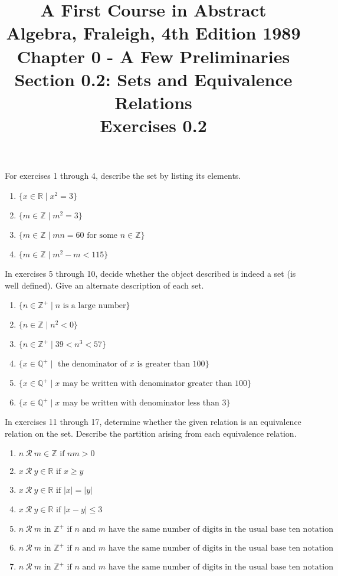 \documentclass[10pt,letterpaper]{article}
\title{A First Course in Abstract Algebra, Fraleigh, 4th Edition 1989\\ Chapter 0 - A Few Preliminaries\\Section 0.2: Sets and Equivalence Relations\\ Exercises 0.2}
\begin{document}
\maketitle
  For exercises 1 through 4, describe the set by listing its elements. 
  \begin{enumerate}
    \item $\{x \in \mathbb{R} \mid x^2 = 3\}$
    \item $\{m \in \mathbb{Z} \mid m^2 = 3\}$
    \item $\{m \in \mathbb{Z} \mid mn = 60 \text{ for some } n \in \mathbb{Z}\}$
    \item $\{m \in \mathbb{Z} \mid m^2 - m < 115\}$
  \end{enumerate}

  In exercises 5 through 10, decide whether the object described is indeed a set (is well defined). 
  Give an alternate description of each set.
  \begin{enumerate}[resume]
    \item $\{n \in \mathbb{Z}^+ \mid n \text{ is a large number}\}$
    \item $\{n \in \mathbb{Z} \mid n^2 < 0\}$
    \item $\{n \in \mathbb{Z}^+ \mid 39 < n^3 < 57\}$
    \item $\{x \in \mathbb{Q}^+ \mid \text{ the denominator of $x$ is greater than 100}\}$
    \item $\{x \in \mathbb{Q}^+ \mid \text{$x$ may be written with denominator greater than 100}\}$
    \item $\{x \in \mathbb{Q}^+ \mid \text{$x$ may be written with denominator less than 3}\}$
  \end{enumerate}

  In exercises 11 through 17, determine whether the given relation is an equivalence relation on the set. Describe the partition arising from each equivalence relation.
  \begin{enumerate}[resume]
    \item $n\: \mathscr{R}\: m \in \mathbb{Z} \text{ if } nm > 0$
    \item $x\: \mathscr{R}\: y \in \mathbb{R} \text{ if } x \ge y$
    \item $x\: \mathscr{R}\: y \in \mathbb{R} \text{ if } |x| = |y|$
    \item $x\: \mathscr{R}\: y \in \mathbb{R} \text{ if } |x-y| \le 3$
    \item $n\: \mathscr{R}\: m \text{ in } \mathbb{Z}^+ \text{ if $n$ and $m$ have the same number of digits in the usual base ten notation }$
    \item $n\: \mathscr{R}\: m \text{ in } \mathbb{Z}^+ \text{ if $n$ and $m$ have the same number of digits in the usual base ten notation }$
    \item $n\: \mathscr{R}\: m \text{ in } \mathbb{Z}^+ \text{ if $n$ and $m$ have the same number of digits in the usual base ten notation }$
  \end{enumerate}
\end{document}
